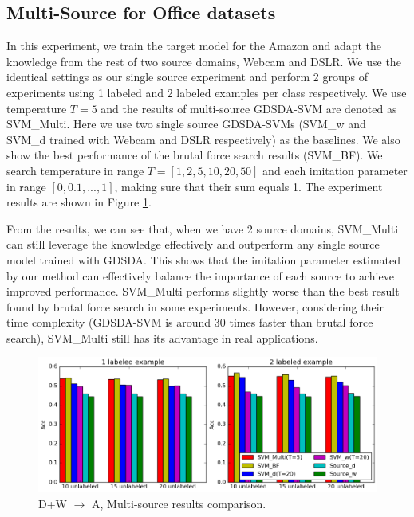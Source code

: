 \subsection{Multi-Source for Office datasets}
In this experiment, we train the target model for the Amazon and adapt the knowledge from the rest of two source domains, Webcam and DSLR.
We use the identical settings as our single source experiment and perform 2 groups of experiments using 1 labeled and 2 labeled examples per class respectively. We use temperature $T=5$ and the results of multi-source GDSDA-SVM are denoted as SVM\_Multi. Here we use two single source GDSDA-SVMs (SVM\_w and SVM\_d trained with Webcam and DSLR respectively) as the baselines. We also show the best performance of the brutal force search results (SVM\_BF). We search temperature in range $T=[1,2,5,10,20,50]$ and each imitation parameter in range $[0,0.1,...,1]$, making sure that their sum equals 1. The experiment results are shown in Figure \ref{fig:multi}.

From the results, we can see that, when we have 2 source domains, SVM\_Multi can still leverage the knowledge effectively and outperform any single source model trained with GDSDA. This shows that the imitation parameter estimated by our method can effectively balance the importance of each source to achieve improved performance. SVM\_Multi performs slightly worse than the best result found by brutal force search in some experiments. However, considering their time complexity (GDSDA-SVM is around 30 times faster than brutal force search), SVM\_Multi still has its advantage in real applications.
\begin{figure}
\centering
\includegraphics[scale=.3]{figure/cmp.png}
\caption{D+W $\rightarrow$ A, Multi-source results comparison.}\label{fig:multi}
\end{figure}



